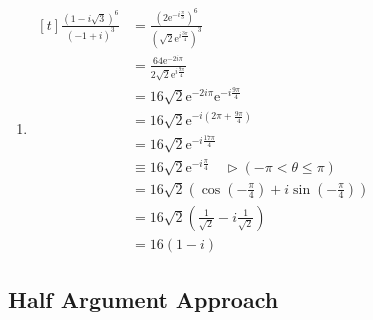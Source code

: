 \documentclass[11pt,a4paper]{book}
\begin{document}
\begin{example}
\begin{enumerate}[label=(\alph*)]
\item
$
\!
\begin{aligned}[t]
{\displaystyle \frac{\left(1-i\sqrt{3}\right)^{6}}{\left(-1+i\right)^{3}}} & =\frac{\left(2\mathrm{e}^{-i\frac{\pi}{3}}\right)^{6}}{\left(\sqrt{2}\mathrm{e}^{i\frac{3\pi}{4}}\right)^{3}}\\
 & =\frac{64\mathrm{e}^{-2i\pi}}{2\sqrt{2}\mathrm{e}^{i\frac{9\pi}{4}}}\\
 & =16\sqrt{2}\mathrm{e}^{-2i\pi}\mathrm{e}^{-i\frac{9\pi}{4}}\\
 & =16\sqrt{2}\mathrm{e}^{-i\left(2\pi+\frac{9\pi}{4}\right)}\\
 & =16\sqrt{2}\mathrm{e}^{-i\frac{17\pi}{4}}\\
 & \equiv16\sqrt{2}\mathrm{e}^{-i\frac{\pi}{4}}\quad\triangleright\left(-\pi<\theta\leq\pi\right)\\
 & =16\sqrt{2}\left(\cos\left(-\frac{\pi}{4}\right)+i\sin\left(-\frac{\pi}{4}\right)\right)\\
 & =16\sqrt{2}\left(\frac{1}{\sqrt{2}}-i\frac{1}{\sqrt{2}}\right)\\
 & =16\left(1-i\right)
\end{aligned}
$

\end{enumerate}

\end{example}

\newpage

\subsection{Half Argument Approach}
\end{document}
